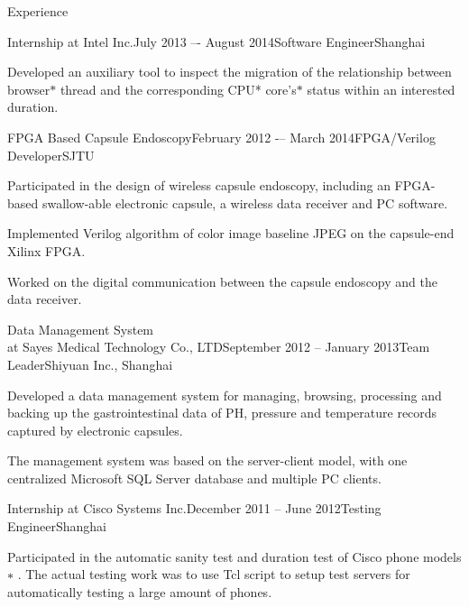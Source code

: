 \documentclass{resume} %
\begin{document}
\begin{rSection}{Experience}
\begin{rSubsection}{Internship at Intel Inc.}{July 2013 –- August 2014}{Software Engineer}{Shanghai}
    \item Developed an auxiliary tool to inspect the migration of the
        relationship between browser$*$ thread and the corresponding CPU* core's$*$ status within an interested duration.

    \end{rSubsection}

    \begin{rSubsection}{FPGA Based Capsule Endoscopy}{February 2012 -– March 2014}{FPGA/Verilog Developer}{SJTU}

    \item Participated in the design of wireless capsule endoscopy, including an
        FPGA-based swallow-able electronic capsule, a wireless data receiver and PC
        software.

    \item Implemented Verilog algorithm of color image baseline JPEG on the
        capsule-end Xilinx FPGA.

    \item Worked on the digital communication between the capsule endoscopy and
        the data receiver.

    \end{rSubsection}

    \begin{rSubsection}{Data Management System\\ at Sayes Medical Technology Co., LTD}{September 2012 -- January 2013}{Team Leader}{Shiyuan Inc., Shanghai}

    \item Developed a data management system for managing, browsing, processing
        and backing up the gastrointestinal data of PH, pressure and
        temperature records captured by electronic capsules.

    \item The management system was based on the server-client model, with one
        centralized Microsoft SQL Server database and multiple PC clients.

    \end{rSubsection}

    \begin{rSubsection}{Internship at Cisco Systems Inc.}{December 2011 -- June 2012}{Testing Engineer}{Shanghai}

    \item Participated in the automatic sanity test and duration test of Cisco
        phone models$∗$ . The actual testing work was to use Tcl script to
        setup test servers for automatically testing a large amount of phones.


\end{rSubsection}
\end{rSection}
\end{document}
